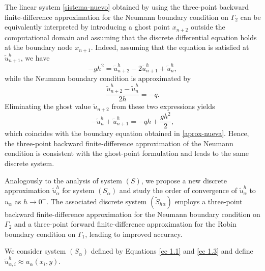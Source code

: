 \documentclass[axioms,article,submit,moreauthors]{Definitions/mdpi}
\begin{document}
\begin{Remark}
The linear system \eqref{sistema-nuevo} obtained by using the three-point backward finite-difference approximation for the Neumann boundary condition on $\Gamma_2$ can be equivalently interpreted by introducing a ghost point $x_{n+2}$ outside the computational domain and assuming that the discrete differential equation holds at the boundary node $x_{n+1}$.
Indeed, assuming that the equation is satisfied at ${\widetilde{u}^h_{n+1}}$, we have
\[
- g h^2 = {\widetilde{u}^h_{n+2}
- 2\widetilde{u}^h_{n+1}
+ \widetilde{u}^h_{n},}
\]
while the Neumann boundary condition is approximated by
\[
{\frac{\widetilde{u}^h_{n+2}-\widetilde{u}^h_{n}}{2h} }= -q .
\]
Eliminating the ghost value $\widetilde{u}_{n+2}$ from these two expressions yields
\[
{-\widetilde{u}^h_{n}+\widetilde{u}^h_{n+1}}
= -q h + \frac{g h^2}{2},
\]
which coincides with the boundary equation obtained in \eqref{aprox-nueva}.
Hence, the three-point backward finite-difference approximation of the Neumann condition is  consistent with the ghost-point formulation and leads to the same discrete system.
\end{Remark}

Analogously to the analysis of system $(S)$, we propose a new discrete approximation ${\widetilde{u}^h_\alpha}$ for system $(S_\alpha)$ and study the order of convergence of ${\widetilde{u}^h_\alpha}$ to $u_\alpha$ as $h \to 0^+$. The associated discrete system $(\widetilde{S}_{h\alpha})$ employs a three-point backward finite-difference approximation for the Neumann boundary condition on $\Gamma_2$ and a three-point forward finite-difference approximation for the Robin boundary condition on $\Gamma_1$, leading to improved accuracy.

We consider system $(S_\alpha)$ defined by Equations \eqref{ec 1.1} and \eqref{ec 1.3} and define ${\widetilde{u}^h_{\alpha,i}} \approx u_\alpha(x_i, y)$. 
\end{document}
